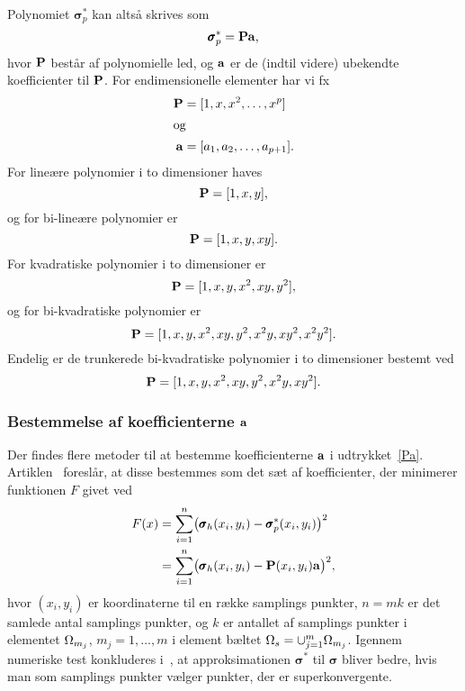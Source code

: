 Polynomiet $\pmb{\sigma}^{\ast}_p$ kan altså skrives som
\begin{equation} \label{Pa}
  \pmb{\sigma}^{\ast}_p = {\bf Pa},
\end{equation}
hvor ${\bf P}$ består af polynomielle led, og ${\bf a}$ er de (indtil
videre) ubekendte koefficienter til ${\bf P}$. For endimensionelle
elementer har vi fx
\begin{align}
  {\bf P} &= [1,x,x^2,\ldots,x^p] \\
\intertext{og}
  {\bf a} &= [a_1,a_2,\ldots,a_{p+1}].
\end{align}
For lineære polynomier i to dimensioner haves
\begin{equation}
  {\bf P} = [1,x,y],
\end{equation}
og for bi-lineære polynomier er
\begin{equation}
  {\bf P} = [1,x,y,xy].
\end{equation}
For kvadratiske polynomier i to dimensioner er
\begin{equation}
  {\bf P} = [1,x,y,x^2,xy,y^2],
\end{equation}
og for bi-kvadratiske polynomier er
\begin{equation}
  {\bf P} = [1,x,y,x^2,xy,y^2,x^2y,xy^2,x^2y^2].
\end{equation}
Endelig er de trunkerede bi-kvadratiske polynomier i to dimensioner
bestemt ved
\begin{equation}
  {\bf P} = [1,x,y,x^2,xy,y^2,x^2y,xy^2].
\end{equation}
\subsubsection{Bestemmelse af koefficienterne ${\bf a}$}
Der findes flere metoder til at bestemme koefficienterne ${\bf a}$ i
udtrykket~\eqref{Pa}. Artiklen~\cite{zz3} foreslår, at disse bestemmes
som det sæt af koefficienter, der minimerer funktionen $F$ givet ved
\begin{align}
  F(x) &= \sum_{i=1}^n \bigl( \pmb{\sigma}_h (x_i,y_i) -
    \pmb{\sigma}^{\ast}_p (x_i,y_i) \bigr)^2 \\
  &= \sum_{i=1}^n \bigl( \pmb{\sigma}_h (x_i,y_i) -
    {\bf P}(x_i,y_i){\bf a} \bigr)^2, \notag
\end{align}
hvor $(x_i,y_i)$ er koordinaterne til en række samplings punkter, $n=mk$
er det samlede antal samplings punkter, og $k$ er antallet af samplings
punkter i elementet $\Omega_{m_j}$, $m_j=1,\ldots,m$ i element bæltet
$\Omega_s=\cup_{j=1}^m \Omega_{m_j}$. Igennem numeriske test konkluderes
i~\cite{zz3}, at approksimationen $\pmb{\sigma}^{\ast}$ til
$\pmb\sigma$ bliver bedre, hvis man som samplings punkter vælger punkter,
der er superkonvergente.

